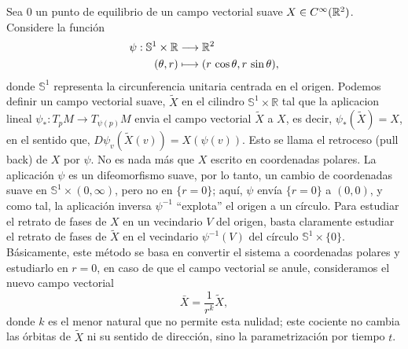 Sea 0 un punto de equilibrio de un campo vectorial suave $X \in C^{\infty}({\mathbb{R}}^{2})$. Considere la función
\begin{equation}
	\begin{aligned}
		\psi : \mathbb{S}^{1} \times \mathbb{R} &\longrightarrow {\mathbb{R}}^{2} \\
		(\theta , r) &\longmapsto (r \, \cos{\theta}, r \, \sin{\theta}),
	\end{aligned}
\end{equation}
donde $\mathbb{S}^{1}$ representa la circunferencia unitaria centrada en el origen.
Podemos definir un campo vectorial suave, $\tilde{X}$ en el cilindro $\mathbb{S}^{1} \times \mathbb{R}$ tal que la aplicacion lineal $\psi_{*}:T_{p}M \longrightarrow T_{\psi(p)}M$ envia el campo vectorial $\tilde{X}$ a $X$, es decir, $\psi_{*}(\tilde{X})=X$, en el sentido que, $D\psi_{v}(\tilde{X}(v)) = X(\psi(v))$. Esto se llama el retroceso (pull back) de $X$ por $\psi$. No es nada más que $X$ escrito en coordenadas polares. La aplicación $\psi$ es un difeomorfismo suave, por lo tanto, un cambio de coordenadas suave en $\mathbb{S}^{1} \times (0,\infty)$, pero no en $\{r=0\}$; aquí, $\psi$ envía $\{r=0\}$ a $(0,0)$, y como tal, la aplicación inversa $\psi^{-1}$ ``explota'' el origen a un círculo. Para estudiar el retrato de fases de $X$ en un vecindario $V$ del origen, basta claramente estudiar el retrato de fases de $\tilde{X}$ en el vecindario $\psi^{-1}(V)$ del círculo $\mathbb{S}^{1}\times \{0\}$. Básicamente, este método se basa en convertir el sistema a coordenadas polares y estudiarlo en $r=0$, en caso de que el campo vectorial se anule, consideramos el nuevo campo vectorial $$\bar{X}=\dfrac{1}{r^{k}}\tilde{X},$$ donde $k$ es el menor natural que no permite esta nulidad; este cociente no cambia las órbitas de $\tilde{X}$ ni su sentido de dirección, sino la parametrización por tiempo $t$. \\

